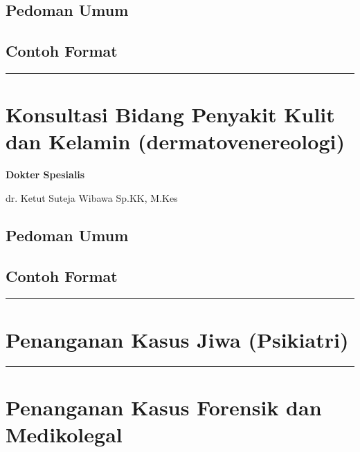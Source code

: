 \documentclass[
]{book}
\begin{document}
\hypertarget{pedoman-umum-8}{%
\subsection{Pedoman Umum}\label{pedoman-umum-8}}

\hypertarget{contoh-format-8}{%
\subsection{Contoh Format}\label{contoh-format-8}}

\begin{center}\rule{0.5\linewidth}{0.5pt}\end{center}

\hypertarget{konsultasi-bidang-penyakit-kulit-dan-kelamin-dermatovenereologi}{%
\section{Konsultasi Bidang Penyakit Kulit dan Kelamin (dermatovenereologi)}\label{konsultasi-bidang-penyakit-kulit-dan-kelamin-dermatovenereologi}}

\textbf{Dokter Spesialis}

dr. Ketut Suteja Wibawa Sp.KK, M.Kes

\hypertarget{pedoman-umum-9}{%
\subsection{Pedoman Umum}\label{pedoman-umum-9}}

\hypertarget{contoh-format-9}{%
\subsection{Contoh Format}\label{contoh-format-9}}

\begin{center}\rule{0.5\linewidth}{0.5pt}\end{center}

\hypertarget{penanganan-kasus-jiwa-psikiatri}{%
\section{Penanganan Kasus Jiwa (Psikiatri)}\label{penanganan-kasus-jiwa-psikiatri}}

\begin{center}\rule{0.5\linewidth}{0.5pt}\end{center}

\hypertarget{penanganan-kasus-forensik-dan-medikolegal}{%
\section{Penanganan Kasus Forensik dan Medikolegal}\label{penanganan-kasus-forensik-dan-medikolegal}}
\end{document}
